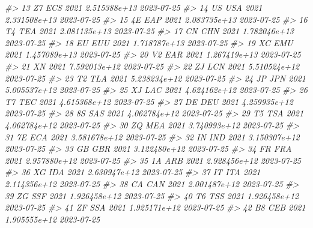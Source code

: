 \documentclass[
  xelatex, ja=standard]{bxjsbook}
\newenvironment{Shaded}{\begin{snugshade}}{\end{snugshade}}
\newcommand{\CommentTok}[1]{\textcolor[rgb]{0.56,0.35,0.01}{\textit{#1}}}
\theoremstyle{definition}
\theoremstyle{definition}
\theoremstyle{definition}
\theoremstyle{definition}
\theoremstyle{remark}
\begin{document}
\begin{Shaded}
\begin{Highlighting}[]
\CommentTok{\#\textgreater{} 13     Z7   ECS 2021 2.515388e+13         2023{-}07{-}25}
\CommentTok{\#\textgreater{} 14     US   USA 2021 2.331508e+13         2023{-}07{-}25}
\CommentTok{\#\textgreater{} 15     4E   EAP 2021 2.083735e+13         2023{-}07{-}25}
\CommentTok{\#\textgreater{} 16     T4   TEA 2021 2.081135e+13         2023{-}07{-}25}
\CommentTok{\#\textgreater{} 17     CN   CHN 2021 1.782046e+13         2023{-}07{-}25}
\CommentTok{\#\textgreater{} 18     EU   EUU 2021 1.718787e+13         2023{-}07{-}25}
\CommentTok{\#\textgreater{} 19     XC   EMU 2021 1.457089e+13         2023{-}07{-}25}
\CommentTok{\#\textgreater{} 20     V2   EAR 2021 1.267419e+13         2023{-}07{-}25}
\CommentTok{\#\textgreater{} 21     XN       2021 7.592013e+12         2023{-}07{-}25}
\CommentTok{\#\textgreater{} 22     ZJ   LCN 2021 5.510524e+12         2023{-}07{-}25}
\CommentTok{\#\textgreater{} 23     T2   TLA 2021 5.238234e+12         2023{-}07{-}25}
\CommentTok{\#\textgreater{} 24     JP   JPN 2021 5.005537e+12         2023{-}07{-}25}
\CommentTok{\#\textgreater{} 25     XJ   LAC 2021 4.624162e+12         2023{-}07{-}25}
\CommentTok{\#\textgreater{} 26     T7   TEC 2021 4.615368e+12         2023{-}07{-}25}
\CommentTok{\#\textgreater{} 27     DE   DEU 2021 4.259935e+12         2023{-}07{-}25}
\CommentTok{\#\textgreater{} 28     8S   SAS 2021 4.062784e+12         2023{-}07{-}25}
\CommentTok{\#\textgreater{} 29     T5   TSA 2021 4.062784e+12         2023{-}07{-}25}
\CommentTok{\#\textgreater{} 30     ZQ   MEA 2021 3.740993e+12         2023{-}07{-}25}
\CommentTok{\#\textgreater{} 31     7E   ECA 2021 3.581678e+12         2023{-}07{-}25}
\CommentTok{\#\textgreater{} 32     IN   IND 2021 3.150307e+12         2023{-}07{-}25}
\CommentTok{\#\textgreater{} 33     GB   GBR 2021 3.122480e+12         2023{-}07{-}25}
\CommentTok{\#\textgreater{} 34     FR   FRA 2021 2.957880e+12         2023{-}07{-}25}
\CommentTok{\#\textgreater{} 35     1A   ARB 2021 2.928456e+12         2023{-}07{-}25}
\CommentTok{\#\textgreater{} 36     XG   IDA 2021 2.630947e+12         2023{-}07{-}25}
\CommentTok{\#\textgreater{} 37     IT   ITA 2021 2.114356e+12         2023{-}07{-}25}
\CommentTok{\#\textgreater{} 38     CA   CAN 2021 2.001487e+12         2023{-}07{-}25}
\CommentTok{\#\textgreater{} 39     ZG   SSF 2021 1.926458e+12         2023{-}07{-}25}
\CommentTok{\#\textgreater{} 40     T6   TSS 2021 1.926458e+12         2023{-}07{-}25}
\CommentTok{\#\textgreater{} 41     ZF   SSA 2021 1.925171e+12         2023{-}07{-}25}
\CommentTok{\#\textgreater{} 42     B8   CEB 2021 1.905555e+12         2023{-}07{-}25}

\end{Highlighting}
\end{Shaded}
\end{document}
